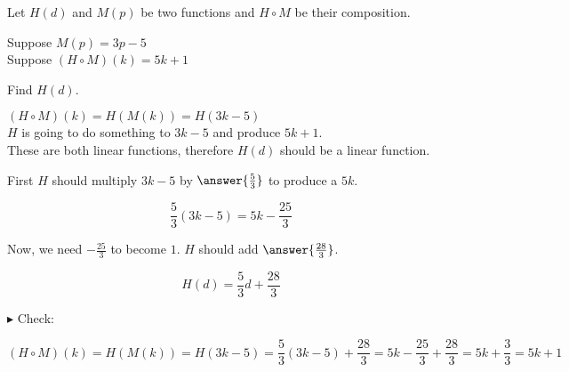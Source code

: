 \documentclass{ximera}
\begin{document}
\begin{example}


Let $H(d)$ and $M(p)$ be two functions and $H \circ M$ be their composition.


Suppose $M(p) = 3 p - 5$ \\

Suppose $(H \circ M)(k) = 5 k + 1$


Find $H(d)$.



\begin{explanation}




$(H \circ M)(k) = H(M(k)) = H(3 k - 5)$  \\



$H$ is going to do something to $3 k - 5$ and produce $5 k + 1$. \\




These are both linear functions, therefore $H(d)$ should be a linear function.


First $H$ should multiply $3 k - 5$ by $\answer{\frac{5}{3}}$ to produce a $5k$.


\[    \frac{5}{3} (3 k - 5) = 5k - \frac{25}{3}   \]



Now, we need $-\frac{25}{3}$ to become $1$.  $H$ should add $\answer{\frac{28}{3}}$.

\[  H(d) =    \frac{5}{3} d +     \frac{28}{3} \]



$\blacktriangleright$ Check: 


\[    (H \circ M)(k) = H(M(k)) = H(3 k - 5) =    \frac{5}{3} (3 k - 5) +     \frac{28}{3}  = 5k - \frac{25}{3}  + \frac{28}{3}  = 5k + \frac{3}{3}  = 5k + 1\]





\end{explanation}

\end{example}
\end{document}
